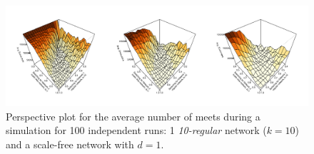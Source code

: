 \begin{figure}[H]
	\centering
	\includegraphics[width=1\linewidth]{"../analysis/pdf/context_switching_1_10regular_1_scale-free_d1_switching_persp"}
	\begin{minipage}{0.9\textwidth}
		\caption{Perspective plot for the average number of meets during a simulation for 100 independent runs: 1 \textit{10-regular} network ($k=10$) and a scale-free network with $d=1$.
		}
		\label{append_fig:ctx_cs_kreg10_sfd1}
	\end{minipage}
\end{figure}




